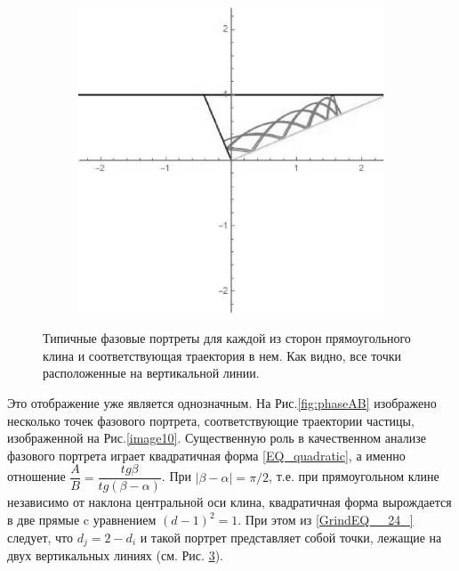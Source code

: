 \documentclass[a4paper]{article}
\begin{document}
\begin{figure}
\begin{subfigure}[b]{0.3\textwidth}
        \label{fig:right_angle_b}
    \end{subfigure}
    ~ %
    \begin{subfigure}[b]{0.3\textwidth}
        \includegraphics[width=\textwidth]{right_angle}
        \label{fig:right_angle_c}
    \end{subfigure}
    \caption{Типичные фазовые портреты для каждой из сторон прямоугольного клина и соответствующая траектория в нем. Как видно, все точки расположенные на вертикальной линии.}\label{fig:right_angle}
\end{figure}


Это отображение уже является однозначным. На Рис.\ref{fig:phaseAB} изображено несколько точек фазового портрета, соответствующие траектории частицы, изображенной на Рис.\ref{image10}. Существенную роль в качественном анализе фазового портрета играет квадратичная форма \eqref{EQ_quadratic}, а именно отношение $\dfrac{A}{B}=\dfrac{tg\beta}{tg\left(\beta-\alpha\right)}$. При $|\beta-\alpha|=\pi/2$, т.е. при прямоугольном клине независимо от наклона центральной оси клина, квадратичная форма вырождается в две прямые c уравнением $\left(d-1\right)^2=1$. При этом из \eqref{GrindEQ__24_} следует, что $d_j=2-d_i$ и такой портрет представляет собой точки, лежащие на двух вертикальных линиях (см. Рис. \ref{fig:right_angle}).
\end{document}
